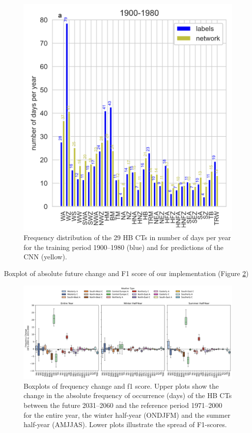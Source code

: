 \documentclass[
]{krantz}
\begin{document}
\begin{figure}

{\centering \includegraphics[width=0.7\linewidth]{work/01-weatherpattern/figures/paper/daycount} 

}

\caption{Frequency distribution of the 29 HB CTs in number of days per year for the training period 1900–1980 (blue) and for predictions of the CNN (yellow).}\label{fig:countpaper}
\end{figure}

Boxplot of absolute future change and F1 score of our implementation (Figure \ref{fig:boxabs})

\begin{figure}

{\centering \includegraphics[width=0.7\linewidth]{work/01-weatherpattern/figures/boxplot_freq_change_abs} 

}

\caption{Boxplots of frequency change and f1 score. Upper plots show the change in the absolute frequency of occurrence (days) of the HB CTs between the future 2031–2060 and the reference period 1971–2000 for the entire year, the winter half-year (ONDJFM) and the summer half-year (AMJJAS).  Lower plots illustrate the spread of F1-scores.}\label{fig:boxabs}
\end{figure}
\end{document}
